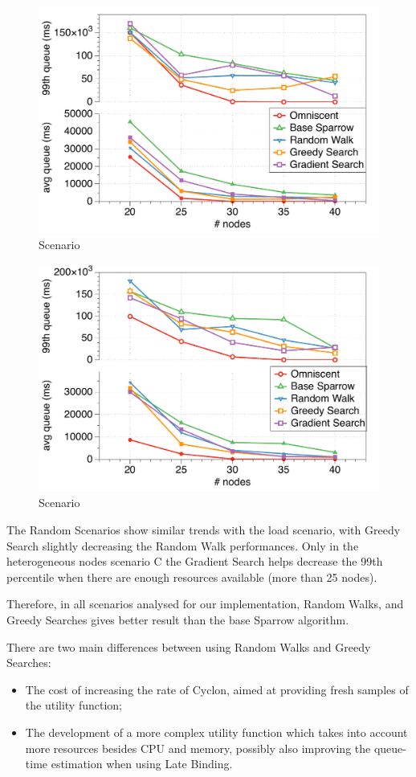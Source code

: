 \documentclass[conference]{IEEEtran}
\begin{document}
  \begin{figure}
  \begin{center}
  \includegraphics[width=.5\textwidth]{figures/randomB}
  \caption{Scenario }
  \label{fig:comparison}
  \end{center}
  \end{figure}

  \begin{figure}
  \begin{center}
  \includegraphics[width=.5\textwidth]{figures/randomC}
  \caption{Scenario }
  \label{fig:comparison}
  \end{center}
  \end{figure}


  The Random Scenarios show similar trends with the load scenario, with
  Greedy Search slightly decreasing the Random Walk performances. Only in
  the heterogeneous nodes scenario C the Gradient Search helps decrease
  the 99th percentile when there are enough resources available (more than
  25 nodes).
 
  Therefore, in all scenarios analysed for our implementation, Random
  Walks, and Greedy Searches gives better result than the base Sparrow
  algorithm.

  There are two main differences between using Random Walks and Greedy
  Searches:
  \begin{itemize}
    \item The cost of increasing the rate of Cyclon, aimed at providing
      fresh samples of the utility function;

    \item The development of a more complex utility function which takes
      into account more resources besides CPU and memory, possibly
      also improving the queue-time estimation when using Late Binding.
  \end{itemize}
\end{document}

